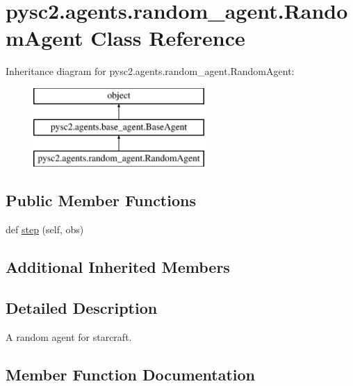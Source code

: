 \hypertarget{classpysc2_1_1agents_1_1random__agent_1_1_random_agent}{}\section{pysc2.\+agents.\+random\+\_\+agent.\+Random\+Agent Class Reference}
\label{classpysc2_1_1agents_1_1random__agent_1_1_random_agent}
Inheritance diagram for pysc2.\+agents.\+random\+\_\+agent.\+Random\+Agent\+:\begin{figure}[H]
\begin{center}
\leavevmode
\includegraphics[height=3.000000cm]{classpysc2_1_1agents_1_1random__agent_1_1_random_agent}
\end{center}
\end{figure}
\subsection*{Public Member Functions}
\begin{DoxyCompactItemize}
\item 
def \mbox{\hyperlink{classpysc2_1_1agents_1_1random__agent_1_1_random_agent_a9d00c7ef3abe7faf24425c49356e438c}{step}} (self, obs)
\end{DoxyCompactItemize}
\subsection*{Additional Inherited Members}


\subsection{Detailed Description}
\begin{DoxyVerb}A random agent for starcraft.\end{DoxyVerb}
 

\subsection{Member Function Documentation}
\mbox{\label{classpysc2_1_1agents_1_1random__agent_1_1_random_agent_a9d00c7ef3abe7faf24425c49356e438c}} 
